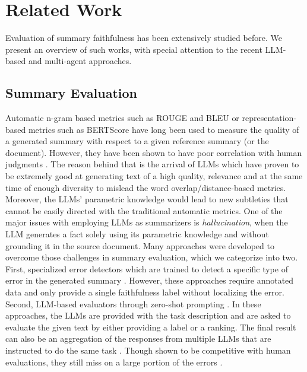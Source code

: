 \section{Related Work}

Evaluation of summary faithfulness has been extensively studied before. We present an overview of such works, with special attention to the recent LLM-based and multi-agent approaches.

\subsection{Summary Evaluation}

Automatic n-gram based metrics such as ROUGE \cite{lin2004rouge} and BLEU \cite{papineni2002bleu} or representation-based metrics such as BERTScore \cite{zhang2020bertscoreevaluatingtextgeneration} have long been used to measure the quality of a generated summary with respect to a given reference summary (or the document). However, they have been shown to have poor correlation with human judgments \cite{gao-wan-2022-dialsummeval,Tang2023.04.22.23288967}. The reason behind that is the arrival of LLMs which have proven to be extremely good at generating text of a high quality, relevance and at the same time of enough diversity to mislead the word overlap/distance-based metrics. Moreover, the LLMs' parametric knowledge would lead to new subtleties that cannot be easily directed with the traditional automatic metrics. One of the major issues with employing LLMs as summarizers is {\it hallucination}, when the LLM generates a fact solely using its parametric knowledge and without grounding it in the source document.
Many approaches were developed to overcome those challenges in summary evaluation, which we categorize into two.
First, specialized error detectors which are trained to detect a specific type of error in the generated summary \cite{kryscinski2020evaluating, fabbri2022qafacteval, goyal2020evaluating, clark2023seahorse, tang2024minicheck}. However, these approaches require annotated data and only provide a single faithfulness label without localizing the error.
 Second, LLM-based evaluators through zero-shot prompting \cite{luo2023chatgptfactualinconsistencyevaluator, wang2023factcheck}. In these approaches, the LLMs are provided with the task description and are asked to evaluate the given text by either providing a label or a ranking. The final result can also be an aggregation of the responses from multiple LLMs that are instructed to do the same task \cite{verga2024replacing}.
 Though shown to be competitive with human evaluations, they still miss on a large portion of the errors \cite{tang2024minicheck,tang2024tofueval}.

